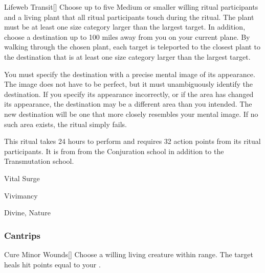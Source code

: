 \lowercase{\hypertarget{spell:Lifeweb Transit}{}}\label{spell:Lifeweb Transit}
\begin{freeability}[\nth{4}]{\hypertarget{spell:Lifeweb Transit}{Lifeweb Transit}}[]
Choose up to five Medium or smaller willing ritual participants and a living plant that all ritual participants touch during the ritual.
The plant must be at least one size category larger than the largest target.
In addition, choose a destination up to 100 miles away from you on your current plane.
By walking through the chosen plant, each target is teleported to the closest plant to the destination that is at least one size category larger than the largest target.

You must specify the destination with a precise mental image of its appearance.
The image does not have to be perfect, but it must unambiguously identify the destination.
If you specify its appearance incorrectly, or if the area has changed its appearance, the destination may be a different area than you intended.
The new destination will be one that more closely resembles your mental image.
If no such area exists, the ritual simply fails.

This ritual takes 24 hours to perform and requires 32 action points from its ritual participants.
It is from from the Conjuration school in addition to the Transmutation school.
\end{freeability}
\vspace{0.25em}


\newpage
\begin{spellsection}{Vital Surge}

\begin{spellheader}
\end{spellheader}


 Vivimancy

 Divine, Nature

\subsubsection{Cantrips}


\begin{apability}{Cure Minor Wounds}[]
Choose a willing living creature within \rngclose range.
The target heals hit points equal to your .
\end{apability}

\end{spellsection}


